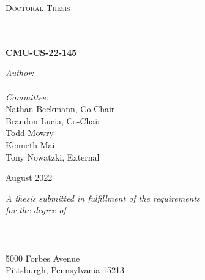 \documentclass[
11pt, %
english, %
singlespacing, %
headsepline, %
]{thesis} %
\author{Graham \textsc{Gobieski}} %
\begin{document}
\frontmatter %

\pagestyle{plain} %


\begin{titlepage}
\begin{center}

\vspace*{.06\textheight}
{\scshape\LARGE \univname\par}\vspace{1cm} %
\textsc{\Large Doctoral Thesis}\\[0.5cm] %

\HRule \\[0.4cm] %
{\LARGE \bfseries \ttitle\par}\vspace{0.4cm} %
\HRule \\[0.5cm] %

\large{\bf CMU-CS-22-145}
 
\begin{flushleft} 
\large
\emph{Author:}\\
\href{http://www.gobieski.com}{\authorname} %
\\[0.5cm]
\emph{Committee:} \\
Nathan Beckmann, Co-Chair \\
Brandon Lucia, Co-Chair \\
Todd Mowry \\
Kenneth Mai \\
Tony Nowatzki, External

\end{flushleft}

\vspace{1em}

\large{August 2022}

\vspace{1em}

\large \textit{A thesis submitted in fulfillment of the requirements\\ for the degree of \degreename}\\[1cm] %
\deptname \\
\schoolname \\
\univname \\[0.3cm]
5000 Forbes Avenue \\
Pittsburgh, Pennsylvania 15213
\\[0.5cm]


\end{center}
\end{titlepage}
\end{document}
